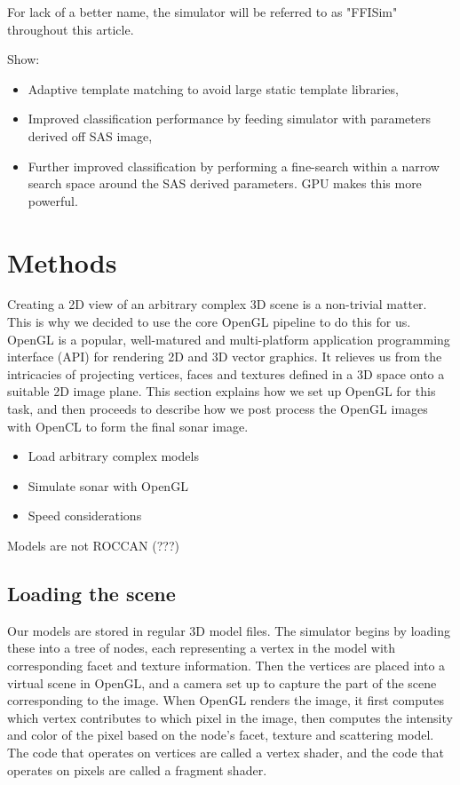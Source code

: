 For lack of a better name, the simulator will be referred to as "FFISim" throughout this article.

Show:
\begin{itemize}
\item Adaptive template matching to avoid large static template libraries,
\item Improved classification performance by feeding simulator with parameters derived off SAS image,
\item Further improved classification by performing a fine-search within a narrow search space around the SAS derived parameters. GPU makes this more powerful.
\end{itemize}


\section{Methods}

Creating a 2D view of an arbitrary complex 3D scene is a non-trivial matter.  This is why we decided to use the core OpenGL pipeline to do this for us. OpenGL is a popular, well-matured and multi-platform application programming interface (API) for rendering 2D and 3D vector graphics. It relieves us from the intricacies of projecting vertices, faces and textures defined in a 3D space onto a suitable 2D image plane. This section explains how we set up OpenGL for this task, and then proceeds to describe how we post process the OpenGL images with OpenCL to form the final sonar image.

\begin{itemize}
\item Load arbitrary complex models
\item Simulate sonar with OpenGL
\item Speed considerations
\end{itemize}

Models are not ROCCAN (???)


\subsection{Loading the scene}

Our models are stored in regular 3D model files. The simulator begins by loading these into a tree of nodes, each representing a vertex in the model with corresponding facet and texture information. Then the vertices are placed into a virtual scene in OpenGL, and a camera set up to capture the part of the scene corresponding to the image. When OpenGL renders the image, it first computes which vertex contributes to which pixel in the image, then computes the intensity and color of the pixel based on the node's facet, texture and scattering model. The code that operates on vertices are called a vertex shader, and the code that operates on pixels are called a fragment shader.

